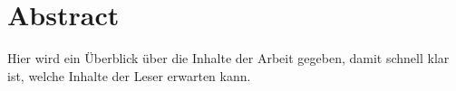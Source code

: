 \chapter*{Abstract}
Hier wird ein Überblick über die Inhalte der Arbeit gegeben, damit schnell klar ist, welche Inhalte der Leser erwarten kann.
